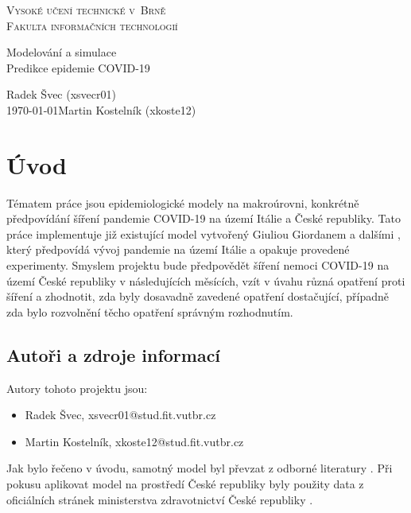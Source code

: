 \documentclass[a4paper,11pt]{article}
\begin{document}
	\begin{titlepage}
		\begin{center}
			\textsc{\Huge Vysoké učení technické v~Brně\\
				\vspace{0.4em}\huge Fakulta informačních technologií}
			
			
			{\LARGE Modelování a simulace\\
				\Huge Predikce epidemie COVID-19\\ \vspace{0.3em}}
			
			
			{\Large \hfill Radek Švec (xsvecr01)\\ \today \hfill Martin Kostelník (xkoste12)}
		\end{center}
	\end{titlepage}

	\section{Úvod}
		Tématem práce jsou epidemiologické modely na makroúrovni, konkrétně předpovídání šíření pandemie COVID-19 na území Itálie a České republiky. Tato práce implementuje již existující model vytvořený Giuliou Giordanem a dalšími \cite{source}, který předpovídá vývoj pandemie na území Itálie a opakuje provedené experimenty. Smyslem projektu bude předpovědět šíření nemoci COVID-19 na území České republiky v následujících měsících, vzít v úvahu různá opatření proti šíření a zhodnotit, zda byly dosavadně zavedené opatření dostačující, případně zda bylo rozvolnění těcho opatření správným rozhodnutím.
		
	\subsection{Autoři a zdroje informací}
		Autory tohoto projektu jsou:
		\begin{itemize}
			\item Radek Švec, xsvecr01@stud.fit.vutbr.cz
			\item Martin Kostelník, xkoste12@stud.fit.vutbr.cz
		\end{itemize}
	
	Jak bylo řečeno v úvodu, samotný model byl převzat z odborné literatury \cite{source}. Při pokusu aplikovat model na prostředí České republiky byly použity data z oficiálních stránek ministerstva zdravotnictví České republiky \cite{mzcr}.
	
\end{document}
